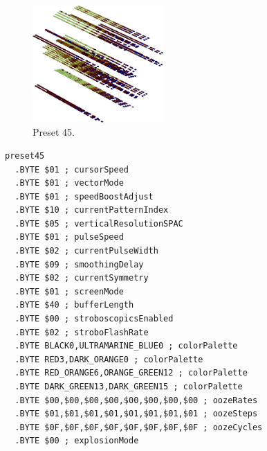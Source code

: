 \clearpage
\begin{minipage}[b]{0.48\linewidth}
\begin{figure}[H]                                                          
  \centering                                                             
  \begin{adjustbox}{width=5cm,center}                                   
  \includegraphics[width=5cm]{src/colorspace_presets/preset45-45.png}%
  \end{adjustbox}                                                        
\caption*{Preset 45.}                                           
\end{figure}                                                               
\end{minipage}
\hspace{0.1cm}
\begin{minipage}[b]{0.48\linewidth}                            
\begin{lstlisting}[basicstyle=\ttfamily\tiny]
preset45
  .BYTE $01 ; cursorSpeed
  .BYTE $01 ; vectorMode
  .BYTE $01 ; speedBoostAdjust
  .BYTE $10 ; currentPatternIndex
  .BYTE $05 ; verticalResolutionSPAC
  .BYTE $01 ; pulseSpeed
  .BYTE $02 ; currentPulseWidth
  .BYTE $09 ; smoothingDelay
  .BYTE $02 ; currentSymmetry
  .BYTE $01 ; screenMode
  .BYTE $40 ; bufferLength
  .BYTE $00 ; stroboscopicsEnabled
  .BYTE $02 ; stroboFlashRate
  .BYTE BLACK0,ULTRAMARINE_BLUE0 ; colorPalette
  .BYTE RED3,DARK_ORANGE0 ; colorPalette
  .BYTE RED_ORANGE6,ORANGE_GREEN12 ; colorPalette
  .BYTE DARK_GREEN13,DARK_GREEN15 ; colorPalette
  .BYTE $00,$00,$00,$00,$00,$00,$00,$00 ; oozeRates
  .BYTE $01,$01,$01,$01,$01,$01,$01,$01 ; oozeSteps
  .BYTE $0F,$0F,$0F,$0F,$0F,$0F,$0F,$0F ; oozeCycles
  .BYTE $00 ; explosionMode
\end{lstlisting}
\end{minipage}

\vspace*{-0.5cm}

